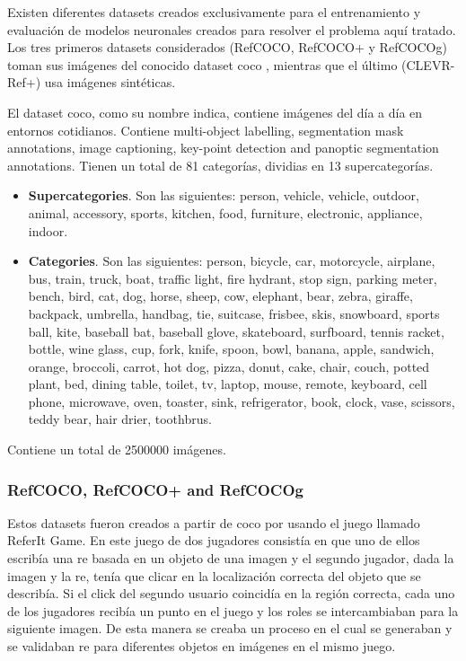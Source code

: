 Existen diferentes datasets creados exclusivamente para el entrenamiento y
evaluación de modelos neuronales creados para resolver el problema aquí
tratado. Los tres primeros datasets considerados (RefCOCO, RefCOCO+ y RefCOCOg)
toman sus imágenes del conocido dataset \gls{coco}
\cite{lin14:micros}, mientras que el último
(CLEVR-Ref+) usa imágenes sintéticas.

El dataset \gls{coco}, como su nombre indica, contiene imágenes del día a día
en entornos cotidianos. Contiene multi-object labelling, segmentation mask
annotations, image captioning, key-point detection and panoptic segmentation
annotations. Tienen un total de 81 categorías, dividias en 13 supercategorías.
\begin{itemize}
  \item \textbf{Supercategories}. Son las siguientes: person, vehicle, vehicle,
  outdoor, animal, accessory, sports, kitchen, food, furniture, electronic,
  appliance, indoor.
  \item \textbf{Categories}. Son las siguientes: person, bicycle, car,
  motorcycle, airplane, bus, train, truck, boat, traffic light, fire hydrant,
  stop sign, parking meter, bench, bird, cat, dog, horse, sheep, cow, elephant,
  bear, zebra, giraffe, backpack, umbrella, handbag, tie, suitcase, frisbee,
  skis, snowboard, sports ball, kite, baseball bat, baseball glove, skateboard,
  surfboard, tennis racket, bottle, wine glass, cup, fork, knife, spoon, bowl,
  banana, apple, sandwich, orange, broccoli, carrot, hot dog, pizza, donut,
  cake, chair, couch, potted plant, bed, dining table, toilet, tv, laptop,
  mouse, remote, keyboard, cell phone, microwave, oven, toaster, sink,
  refrigerator, book, clock, vase, scissors, teddy bear, hair drier, toothbrus.
\end{itemize}
Contiene un total de \num{2500000} imágenes.

\subsubsection{RefCOCO, RefCOCO+ and RefCOCOg}
Estos datasets fueron creados a partir de \gls{coco} por
 usando el juego llamado ReferIt Game. En este
juego de dos jugadores consistía en que uno de ellos escribía una \gls{re}
basada en un objeto de una imagen y el segundo jugador, dada la imagen y la
\gls{re}, tenía que clicar en la localización correcta del objeto que se
describía. Si el click del segundo usuario coincidía en la región correcta,
cada uno de los jugadores recibía un punto en el juego y los roles se
intercambiaban para la siguiente imagen. De esta manera se creaba un proceso en
el cual se generaban y se validaban \gls{re} para diferentes objetos en
imágenes en el mismo juego.

